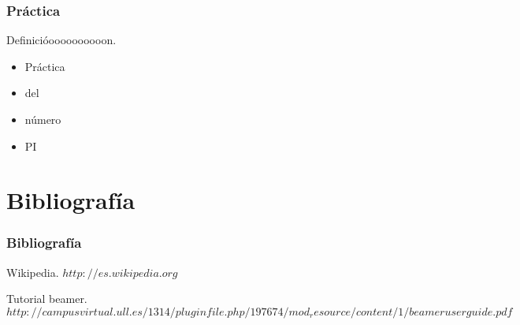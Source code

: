 \documentclass{beamer}
\begin{document}
\begin{frame}
\frametitle{Práctica}

\begin{definition}
  Definicióoooooooooon.
\end{definition}

\begin{example}
  \begin{itemize}
    \item <1-> Práctica \pause
    \item <2-> del \pause
    \item <3-> número \pause
    \item <4-> PI  
  \end{itemize}
\end{example}

\end{frame}

\section{Bibliografía}
\begin{frame}
  \frametitle{Bibliografía}

  \begin{thebibliography}{10}

    \beamertemplatebookbibitems
    Wikipedia.
    {\small $http://es.wikipedia.org$}
    
    \beamertemplatebookbibitems
    Tutorial beamer. {\small $http://campusvirtual.ull.es/1314/pluginfile.php/197674/mod_resource/content/1/beameruserguide.pdf$}

  \end{thebibliography}
\end{frame}

\end{document}

